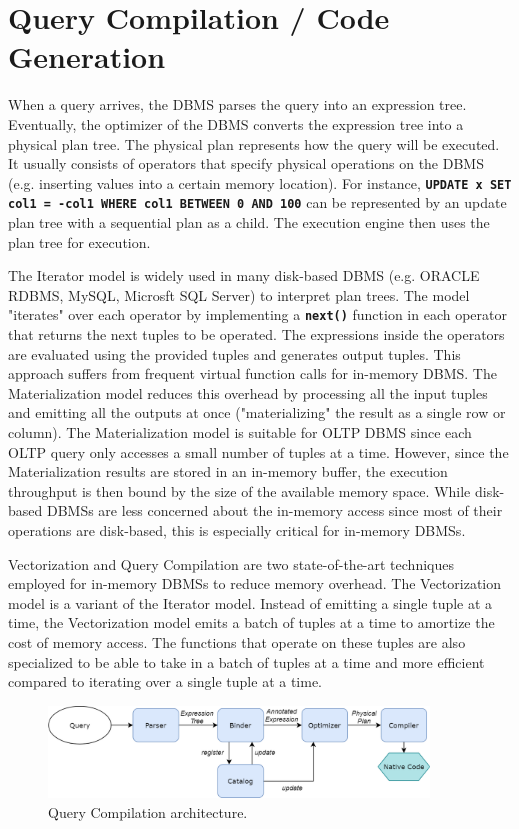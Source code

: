 \documentclass[12pt]{cmuthesis}
\newcommand{\dbSQL}[1]{\texttt{\textbf{#1}}\xspace}
\begin{document}
\section{Query Compilation / Code Generation}
When a query arrives, the DBMS parses the query into an expression tree. Eventually, the optimizer of the DBMS converts the expression tree into a physical plan tree. The physical plan represents how the query will be executed. It usually consists of operators that specify physical operations on the DBMS (e.g. inserting values into a certain memory location). For instance, \dbSQL{UPDATE x SET col1 = -col1 WHERE col1 BETWEEN 0 AND 100} can be represented by an update plan tree with a sequential plan as a child. The execution engine then uses the plan tree for execution.

The Iterator model\cite{volcano} is widely used in many disk-based DBMS (e.g. ORACLE RDBMS, MySQL, Microsft SQL Server) to interpret plan trees. The model "iterates" over each operator by implementing a \dbSQL{next()} function in each operator that returns the next tuples to be operated. The expressions inside the operators are evaluated using the provided tuples and generates output tuples. This approach suffers from frequent virtual function calls for in-memory DBMS. The Materialization model reduces this overhead by processing all the input tuples and emitting all the outputs at once ("materializing" the result as a single row or column). The Materialization model is suitable for OLTP DBMS since each OLTP query only accesses a small number of tuples at a time. However, since the Materialization results are stored in an in-memory buffer, the execution throughput is then bound by the size of the available memory space. While disk-based DBMSs are less concerned about the in-memory access since most of their operations are disk-based, this is especially critical for in-memory DBMSs.

Vectorization and Query Compilation are two state-of-the-art techniques employed for in-memory DBMSs to reduce memory overhead\cite{kersten18}. The Vectorization model is a variant of the Iterator model. Instead of emitting a single tuple at a time, the Vectorization model emits a batch of tuples at a time to amortize the cost of memory access. The functions that operate on these tuples are also specialized to be able to take in a batch of tuples at a time and more efficient compared to iterating over a single tuple at a time.

\begin{figure}[H]
\centering
\includegraphics[width=0.9\textwidth]{images/QueryCompilation.png}
\caption{Query Compilation architecture.}
\label{fig:query_compilation}
\end{figure}
\end{document}

